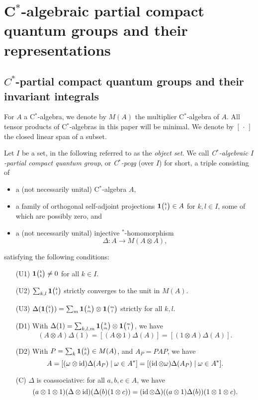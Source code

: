 \section{C$^*$-algebraic partial compact quantum groups and their representations}


\subsection{$C^{*}$-partial compact quantum groups and their invariant integrals}

For $A$ a C$^*$-algebra, we denote by $M(A)$ the multiplier C$^*$-algebra of $A$. All tensor products of C$^*$-algebras in this paper will be minimal. We denote by $[\,\cdot\,]$ the closed linear span of a subset.

\begin{Def}\label{DefCpcqg} Let $I$ be a set, in the following referred to as the \emph{object set}. We call \emph{C$^*$-algebraic $I$-partial compact quantum group}, or \emph{C$^*$-pcqg} (over $I$) for short, a triple consisting of 
\begin{itemize}
\item a (not necessarily unital) C$^*$-algebra $A$,
\item a family of orthogonal self-adjoint projections $\mathbf{1}{\tiny {\begin{pmatrix} k\\l\end{pmatrix}}}\in A$ for $k,l\in I$, some of which are possibly zero, and
\item  a (not necessarily unital) injective $^*$-homomorphism \[\Delta: A\rightarrow M(A\otimes A),\] 
\end{itemize}
satisfying the following conditions:
\begin{enumerate}[(a)]
\item[(U1)] $\mathbf{1}{\tiny {\begin{pmatrix} k\\k\end{pmatrix}}}\neq 0$ for all $k\in I$. 
\item[(U2)] $\sum_{k,l} \mathbf{1}{\tiny {\begin{pmatrix} k\\l\end{pmatrix}}}$ strictly converges to the unit in $M(A)$.
\item[(U3)] $\Delta(\mathbf{1}{\tiny {\begin{pmatrix} k\\l\end{pmatrix}}}) = \sum_{m}\mathbf{1}{\tiny {\begin{pmatrix} k\\m\end{pmatrix}}}\otimes \mathbf{1}{\tiny {\begin{pmatrix} m\\l\end{pmatrix}}}$ strictly for all $k,l$. 
\item[(D1)] With $\Delta(1) = \sum_{k,l,m} \mathbf{1}{\tiny {\begin{pmatrix} k\\m\end{pmatrix}}}\otimes \mathbf{1}{\tiny {\begin{pmatrix} m\\l\end{pmatrix}}}$, we have \begin{equation}\label{CondDi}(A\otimes A)\Delta(1) = [(A\otimes 1)\Delta(A)] = [(1\otimes A)\Delta(A)].\end{equation} 
\item[(D2)] With $P=\sum_{k} \mathbf{1}{\tiny {\begin{pmatrix} k\\k\end{pmatrix}}}\in M(A)$, and $A_P = PAP$, we have \[A=[(\omega\otimes \operatorname{id})\Delta(A_P)\mid \omega \in A^*] = [(\operatorname{id}\otimes \omega)\Delta(A_P)\mid \omega \in A^*].\]
\item[(C)] $\Delta$ is coassociative: for all $a,b,c\in A$, we have \[(a\otimes 1\otimes 1)(\Delta\otimes \operatorname{id})(\Delta(b)(1\otimes c)) = (\operatorname{id}\otimes \Delta)((a\otimes 1)\Delta(b))(1\otimes 1\otimes c).\] 
\end{enumerate}
\end{Def} 

